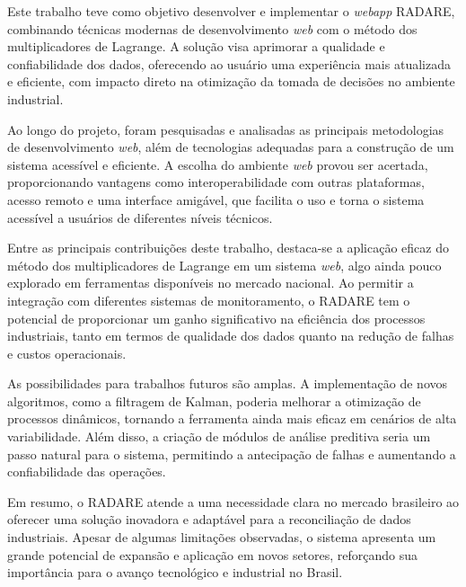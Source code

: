 \label{Cap:Conclusao}

Este trabalho teve como objetivo desenvolver e implementar o \textit{webapp} RADARE, combinando técnicas modernas de desenvolvimento \textit{web} com o método dos multiplicadores de Lagrange. A solução visa aprimorar a qualidade e confiabilidade dos dados, oferecendo ao usuário uma experiência mais atualizada e eficiente, com impacto direto na otimização da tomada de decisões no ambiente industrial.

Ao longo do projeto, foram pesquisadas e analisadas as principais metodologias de desenvolvimento \textit{web}, além de tecnologias adequadas para a construção de um sistema acessível e eficiente. A escolha do ambiente \textit{web} provou ser acertada, proporcionando vantagens como interoperabilidade com outras plataformas, acesso remoto e uma interface amigável, que facilita o uso e torna o sistema acessível a usuários de diferentes níveis técnicos.

Entre as principais contribuições deste trabalho, destaca-se a aplicação eficaz do método dos multiplicadores de Lagrange em um sistema \textit{web}, algo ainda pouco explorado em ferramentas disponíveis no mercado nacional. Ao permitir a integração com diferentes sistemas de monitoramento, o RADARE tem o potencial de proporcionar um ganho significativo na eficiência dos processos industriais, tanto em termos de qualidade dos dados quanto na redução de falhas e custos operacionais.

As possibilidades para trabalhos futuros são amplas. A implementação de novos algoritmos, como a filtragem de Kalman, poderia melhorar a otimização de processos dinâmicos, tornando a ferramenta ainda mais eficaz em cenários de alta variabilidade. Além disso, a criação de módulos de análise preditiva seria um passo natural para o sistema, permitindo a antecipação de falhas e aumentando a confiabilidade das operações.

Em resumo, o RADARE atende a uma necessidade clara no mercado brasileiro ao oferecer uma solução inovadora e adaptável para a reconciliação de dados industriais. Apesar de algumas limitações observadas, o sistema apresenta um grande potencial de expansão e aplicação em novos setores, reforçando sua importância para o avanço tecnológico e industrial no Brasil.